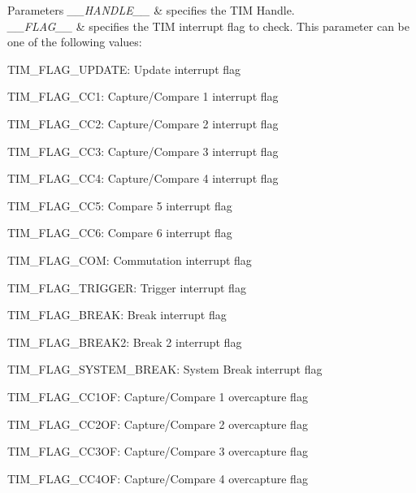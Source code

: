 \begin{DoxyParams}{Parameters}
{\em \+\_\+\+\_\+\+H\+A\+N\+D\+L\+E\+\_\+\+\_\+} & specifies the T\+IM Handle. \\
\hline
{\em \+\_\+\+\_\+\+F\+L\+A\+G\+\_\+\+\_\+} & specifies the T\+IM interrupt flag to check. This parameter can be one of the following values\+: \begin{DoxyItemize}
\item T\+I\+M\+\_\+\+F\+L\+A\+G\+\_\+\+U\+P\+D\+A\+TE\+: Update interrupt flag \item T\+I\+M\+\_\+\+F\+L\+A\+G\+\_\+\+C\+C1\+: Capture/\+Compare 1 interrupt flag \item T\+I\+M\+\_\+\+F\+L\+A\+G\+\_\+\+C\+C2\+: Capture/\+Compare 2 interrupt flag \item T\+I\+M\+\_\+\+F\+L\+A\+G\+\_\+\+C\+C3\+: Capture/\+Compare 3 interrupt flag \item T\+I\+M\+\_\+\+F\+L\+A\+G\+\_\+\+C\+C4\+: Capture/\+Compare 4 interrupt flag \item T\+I\+M\+\_\+\+F\+L\+A\+G\+\_\+\+C\+C5\+: Compare 5 interrupt flag \item T\+I\+M\+\_\+\+F\+L\+A\+G\+\_\+\+C\+C6\+: Compare 6 interrupt flag \item T\+I\+M\+\_\+\+F\+L\+A\+G\+\_\+\+C\+OM\+: Commutation interrupt flag \item T\+I\+M\+\_\+\+F\+L\+A\+G\+\_\+\+T\+R\+I\+G\+G\+ER\+: Trigger interrupt flag \item T\+I\+M\+\_\+\+F\+L\+A\+G\+\_\+\+B\+R\+E\+AK\+: Break interrupt flag ~\newline
 \item T\+I\+M\+\_\+\+F\+L\+A\+G\+\_\+\+B\+R\+E\+A\+K2\+: Break 2 interrupt flag ~\newline
 \item T\+I\+M\+\_\+\+F\+L\+A\+G\+\_\+\+S\+Y\+S\+T\+E\+M\+\_\+\+B\+R\+E\+AK\+: System Break interrupt flag \item T\+I\+M\+\_\+\+F\+L\+A\+G\+\_\+\+C\+C1\+OF\+: Capture/\+Compare 1 overcapture flag \item T\+I\+M\+\_\+\+F\+L\+A\+G\+\_\+\+C\+C2\+OF\+: Capture/\+Compare 2 overcapture flag \item T\+I\+M\+\_\+\+F\+L\+A\+G\+\_\+\+C\+C3\+OF\+: Capture/\+Compare 3 overcapture flag \item T\+I\+M\+\_\+\+F\+L\+A\+G\+\_\+\+C\+C4\+OF\+: Capture/\+Compare 4 overcapture flag \end{DoxyItemize}
\\
\hline
\end{DoxyParams}

